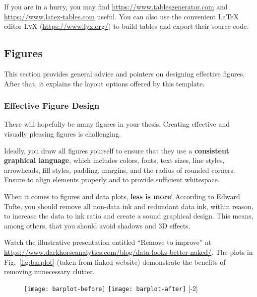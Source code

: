 If you are in a hurry, you may find \url{https://www.tablesgenerator.com} and \url{https://www.latex-tables.com} useful. You can also use the convenient LaTeX editor \textsc{LyX} (\url{https://www.lyx.org/}) to build tables and export their source code.

\subsection{Figures}

This section provides general advice and pointers on designing effective figures. After that, it explains the layout options offered by this template.

\subsubsection{Effective Figure Design}

There will hopefully be many figures in your thesis. Creating effective and visually pleasing figures is challenging.

Ideally, you draw all figures yourself to ensure that they use a \textbf{consistent graphical language}, which includes colors, fonts, text sizes, line styles, arrowheads, fill styles, padding, margins, and the radius of rounded corners. Ensure to align elements properly and to provide sufficient whitespace.

When it comes to figures and data plots, \textbf{less is more}! According to Edward Tufte,%
you should remove all non-data ink and redundant data ink, within reason, to increase the data to ink ratio and create a sound graphical design. This means, among others, that you should avoid shadows and 3D effects.

Watch the illustrative presentation entitled ``Remove to improve'' at \url{https://www.darkhorseanalytics.com/blog/data-looks-better-naked/}. The plots in Fig.~\ref{fig:barplot} (taken from linked website) demonstrate the benefits of removing unnecessary clutter.


\begin{figure}[t]
\centering
\texttt{[image: barplot-before]}%
\hspace{\fill}%
\texttt{[image: barplot-after]}
[-2\baselineskip]
\end{figure}


